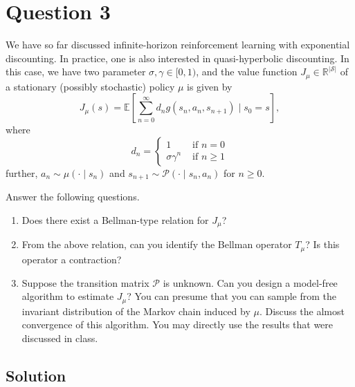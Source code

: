 \section*{Question 3}

We have so far discussed infinite-horizon reinforcement learning with exponential discounting.
In practice, one is also interested in quasi-hyperbolic discounting.
In this case, we have two parameter \( \sigma, \gamma \in [0,1) \), and the value function \( J_{\mu} \in \mathbb{R}^{\vert\mathcal{S}\vert} \) of a stationary (possibly stochastic) policy \( \mu \) is given by
\[
    J_{\mu}(s)=\mathbb{E}\left[\sum_{n=0}^{\infty} d_{n} g\left(s_{n}, a_{n}, s_{n+1}\right) \mid s_{0}=s\right],
\]
where
\[
    d_{n}= \begin{cases}1 & \text { if } n=0 \\ \sigma \gamma^{n} & \text { if } n \geq 1\end{cases}
\]
further, \( a_{n} \sim \mu\left(\cdot \mid s_{n}\right) \) and \( s_{n+1} \sim \mathcal{P}\left(\cdot \mid s_{n}, a_{n}\right) \) for \( n \geq 0 \).

Answer the following questions.
\begin{enumerate}[label= (\alph*), noitemsep]
    \item Does there exist a Bellman-type relation for \( J_{\mu} \)?
    \item From the above relation, can you identify the Bellman operator \( T_{\mu} \)?
          Is this operator a contraction?
    \item Suppose the transition matrix \( \mathcal{P} \) is unknown.
          Can you design a model-free algorithm to estimate \( J_{\mu} \)?
          You can presume that you can sample from the invariant distribution of the Markov chain induced by \( \mu \).
          Discuss the almost convergence of this algorithm.
          You may directly use the results that were discussed in class.
\end{enumerate}

\subsection*{Solution}
